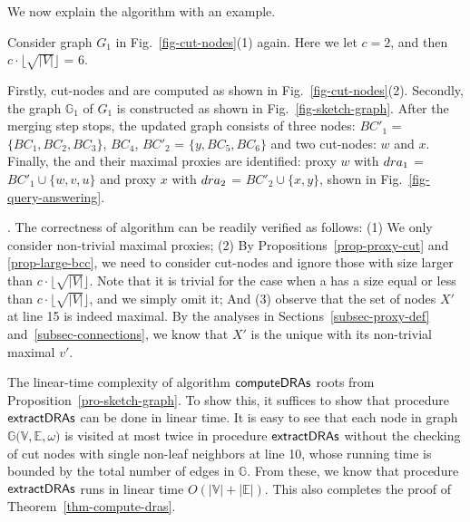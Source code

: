 We now explain the algorithm with an example.

\vspace{-0.5ex}
\begin{example}
\label{exm-compute-proxies} Consider graph $G_1$ in Fig.~\ref{fig-cut-nodes}(1) again. Here we let $c = 2$, and then $c\cdot\lfloor\sqrt{|V|}\rfloor$ = $6$.

Firstly, cut-nodes and \bccs are computed as shown in Fig.~\ref{fig-cut-nodes}(2).
Secondly, the \bcsketch graph $\mathbb{G}_1$ of $G_1$ is constructed as shown in Fig.~\ref{fig-sketch-graph}.
After the merging step stops, the updated \bcsketch graph consists of three \bc nodes:
$BC'_1$ = $\{BC_1, BC_2, BC_3\}$, $BC_4$, $BC'_2$ = $\{y, BC_5, BC_6\}$ and two cut-nodes: $w$ and $x$.
Finally, the \dras and their maximal proxies are identified: proxy $w$ with ${\sc dra}_1$ = $BC'_1\cup\{w, v, u\}$ and proxy $x$ with  ${\sc dra}_2$ = $BC'_2\cup\{x, y\}$, shown in Fig.~\ref{fig-query-answering}.
\end{example}
\vspace{-0.5ex}

\vspace{-1ex}
. The correctness of algorithm \compDRAs can be readily verified as follows:
(1) We only consider non-trivial maximal proxies; (2) By Propositions~\ref{prop-proxy-cut} and \ref{prop-large-bcc}, we need to consider cut-nodes and ignore those \bccs with size larger than $c\cdot\lfloor\sqrt{|V|}\rfloor$. Note that it is trivial for the case when a \cc has a size equal or less than $c\cdot\lfloor\sqrt{|V|}\rfloor$, and we simply omit it; And (3) observe that the set of nodes $X'$ at line 15 is indeed maximal. By the analyses in Sections~\ref{subsec-proxy-def} and~\ref{subsec-connections}, we know that $X'$ is the unique \dra with its non-trivial  maximal $v'$.


The linear-time complexity of algorithm ${\mathsf{computeDRAs}}$ roots from Proposition~\ref{pro-sketch-graph}.
To show this, it suffices to show that procedure ${\mathsf{extractDRAs}}$ can be done in linear time.
It is easy to see that each node in \bcsketch graph $\mathbb{G(V, E}, \omega)$ is visited at most twice in procedure ${\mathsf{extractDRAs}}$ without the checking of cut nodes with single non-leaf neighbors at line 10, whose running time is bounded by the total number of edges in $\mathbb{G}$.
From these, we know that procedure ${\mathsf{extractDRAs}}$ runs in linear time $O(|\mathbb{V}|+|\mathbb{E}|)$.
%
This also completes the proof of Theorem~\ref{thm-compute-dras}.



